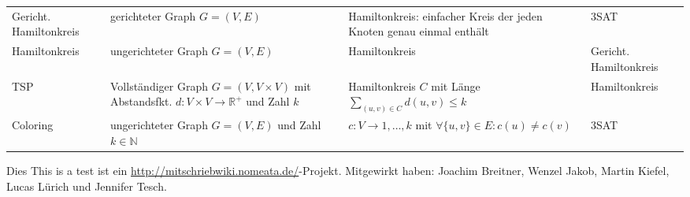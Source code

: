 \documentclass{article}
\newcommand{\h}[1]{\vspace{1ex}\begin{center}\small\textbf{#1}\end{center}}
\begin{document}
\begin{tabular}{p{1.6cm}p{6cm}p{6cm}p{1.8cm}}
		Gericht. Hamiltonkreis &	gerichteter Graph $G=(V,E)$	&	Hamiltonkreis: einfacher Kreis der jeden Knoten genau einmal enthält	& 3SAT \\
		Hamiltonkreis & ungerichteter Graph $G=(V,E)$	&	Hamiltonkreis	& Gericht. Hamiltonkreis \\
		TSP					& Vollständiger Graph $G=(V,V\times V)$ mit Abstandsfkt. $d:V\times V\to\mathbb{R}^+$ und Zahl $k$ & Hamiltonkreis $C$ mit Länge $\sum_{(u,v)\in C} d(u,v)\le k$ & Hamiltonkreis \\
		Coloring		&	ungerichteter Graph $G=(V,E)$ und Zahl $k \in \mathbb{N}$ &	$c:V\to 1,\ldots,k$ mit $\forall{\{u,v\}\in E}: c(u) \ne c(v)$	& 3SAT \\
								
		\end{tabular}



Dies This is a test ist ein \url{http://mitschriebwiki.nomeata.de/}-Projekt. Mitgewirkt haben: Joachim Breitner, Wenzel Jakob, Martin Kiefel, Lucas Lürich und Jennifer Tesch.
\end{document}
